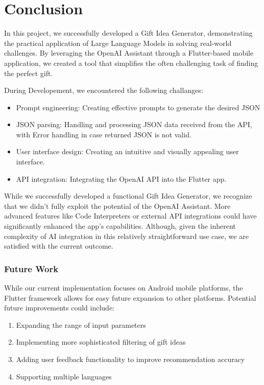 \chapter{Conclusion}
\label{chapter:conclusion}

In this project, we successfully developed a Gift Idea Generator, demonstrating the practical application of Large Language Models in solving real-world challenges. By leveraging the OpenAI Assistant through a Flutter-based mobile application, we created a tool that simplifies the often challenging task of finding the perfect gift.

During Developement, we encountered the following challanges:

\begin{itemize}
	\item Prompt engineering: Creating effective prompts to generate the desired JSON
	\item JSON parsing: Handling and processing JSON data received from the API, with Error handling in case returned JSON is not valid.
	\item User interface design: Creating an intuitive and visually appealing user interface.
	\item API integration: Integrating the OpenAI API into the Flutter app.
\end{itemize}

While we successfully developed a functional Gift Idea Generator, we recognize that we didn't fully exploit the potential of the OpenAI Assistant. More advanced features like Code Interpreters or external API integrations could have significantly enhanced the app's capabilities. Although, given the inherent complexity of AI integration in this relatively straightforward use case, we are satisfied with the current outcome.

\subsection*{Future Work}

While our current implementation focuses on Android mobile platforms, the Flutter framework allows for easy future expansion to other platforms. Potential future improvements could include:
\begin{enumerate}
	\item Expanding the range of input parameters
	\item Implementing more sophisticated filtering of gift ideas
	\item Adding user feedback functionality to improve recommendation accuracy
	\item Supporting multiple languages
\end{enumerate}
